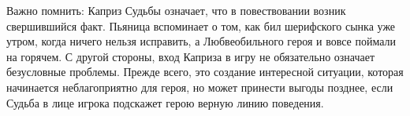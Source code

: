 \begin{tcolorbox}
    Важно помнить: Каприз Судьбы означает, что в повествовании возник свершившийся факт. Пьяница вспоминает о том, как бил шерифского сынка уже утром, когда ничего нельзя исправить, а Любвеобильного героя и вовсе поймали на горячем. С другой стороны, вход Каприза в игру не обязательно означает безусловные проблемы. Прежде всего, это создание интересной ситуации, которая начинается неблагоприятно для героя, но может принести выгоды позднее, если Судьба в лице игрока подскажет герою верную линию поведения. 
\end{tcolorbox}
